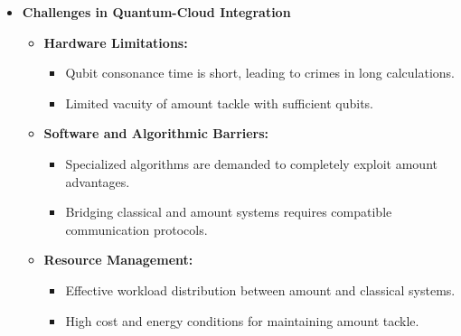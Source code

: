 \documentclass[conference]{IEEEtran}
\begin{document}
\begin{itemize}
    \item \textbf{Challenges in Quantum-Cloud Integration}
    \begin{itemize}
        \item \textbf{Hardware Limitations:}
        \begin{itemize}
            \item Qubit consonance time is short, leading to crimes in long calculations.
            \item Limited vacuity of amount tackle with sufficient qubits.
        \end{itemize}
        \item \textbf{Software and Algorithmic Barriers:}
        \begin{itemize}
           \item Specialized algorithms are demanded to completely exploit amount advantages.
           \item Bridging classical and amount systems requires compatible communication protocols.
        \end{itemize}
        \item \textbf{Resource Management:}
        \begin{itemize}
           \item Effective workload distribution between amount and classical systems.
           \item High cost and energy conditions for maintaining amount tackle.
        \end{itemize}
    \end{itemize}


\end{itemize}
\end{document}
